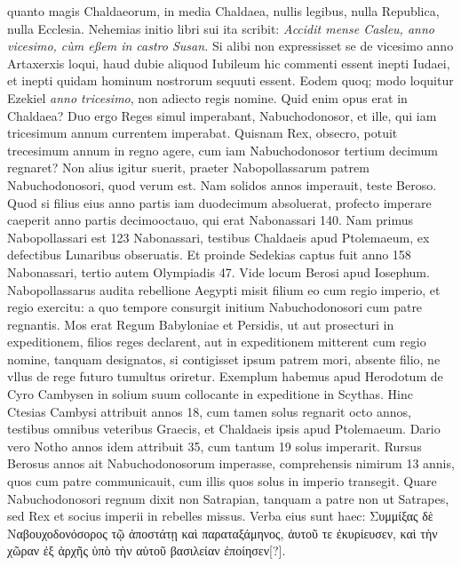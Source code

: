 quanto magis Chaldaeorum, in media Chaldaea, nullis legibus,
nulla Republica, nulla Ecclesia.
Nehemias initio libri sui ita
scribit: \textit{Accidit mense Casleu, anno vicesimo, cùm eßem in castro Susan.}
Si alibi non expressisset se de vicesimo anno Artaxerxis loqui, haud
dubie aliquod Iubileum hic commenti essent inepti Iudaei, et inepti
quidam hominum nostrorum sequuti essent.
Eodem quoq; modo
loquitur Ezekiel \textit{anno tricesimo}, non adiecto regis nomine.
Quid enim opus erat in Chaldaea?
Duo ergo Reges simul imperabant,
Nabuchodonosor, et ille, qui iam tricesimum annum currentem
imperabat.
Quisnam Rex, obsecro, potuit trecesimum annum in regno
agere, cum iam Nabuchodonosor tertium decimum regnaret?
Non alius igitur suerit, praeter Nabopollassarum patrem Nabuchodonosori,
quod verum est.
Nam  solidos annos imperauit,
teste Beroso.
%
Quod si filius eius anno  partis iam duodecimum
absoluerat, profecto imperare caeperit anno partis decimooctauo,
qui erat Nabonassari 140.
Nam primus Nabopollassari est 123 Nabonassari,
testibus Chaldaeis apud Ptolemaeum, ex defectibus Lunaribus
obseruatis.
Et proinde Sedekias captus fuit anno 158 Nabonassari,
tertio autem Olympiadis 47.
Vide locum Berosi apud Iosephum.
Nabopollassarus audita rebellione Aegypti misit filium eo
cum regio imperio, et regio exercitu: a quo tempore consurgit initium
Nabuchodonosori cum patre regnantis.
Mos erat Regum Babyloniae
et Persidis, ut aut prosecturi in expeditionem, filios reges declarent,
aut in expeditionem mitterent cum regio nomine, tanquam
designatos, si contigisset ipsum patrem mori, absente filio, ne
vllus de rege futuro tumultus oriretur.
Exemplum habemus apud
Herodotum de Cyro Cambysen in solium suum collocante in expeditione
in Scythas.
Hinc Ctesias Cambysi attribuit annos 18,
cum tamen solus regnarit octo annos, testibus omnibus veteribus
Graecis, et Chaldaeis ipsis apud Ptolemaeum.
Dario vero Notho annos
idem attribuit 35, cum tantum 19 solus imperarit.
Rursus Berosus
 annos ait Nabuchodonosorum imperasse, comprehensis
nimirum 13 annis, quos cum patre communicauit, cum
illis quos solus in imperio transegit.
Quare Nabuchodonosori regnum
dixit non Satrapian, tanquam a patre non ut Satrapes, sed Rex
et socius imperii in rebelles missus.
Verba eius sunt haec: \textgreek{Συμμίξας
δὲ Ναβουχοδονόσορος τῷ ἀποστάτῃ καὶ παραταξάμηνος, ἀυτοῦ τε ἐκυρίευσεν, καὶ
τὴν χῶραν ἐξ ἀρχῆς ὑπὸ τὴν αὑτοῦ βασιλείαν ἐποίησεν[?]}.
